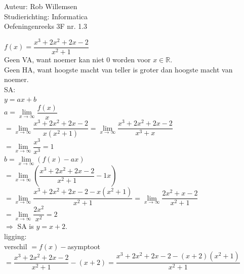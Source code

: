 \documentclass[a4paper]{article}
\newcommand{\limit}{\lim\limits}
\begin{document}
\noindent \large Auteur: Rob Willemsen \\
\noindent \large Studierichting: Informatica \\
\noindent \large Oefeningenreeks 3F nr. 1.3 \\

\medskip

\normalsize

$f(x) = \dfrac{x^3 + 2x^2 + 2x - 2}{x^2+1}$ \\

Geen VA, want noemer kan niet 0 worden voor $x \in \mathbb{R}$. \\

Geen HA, want hoogste macht van teller is groter dan hoogste macht van noemer. \\

SA: \\

$y = ax + b$ \\

$a = \limit_{x \rightarrow \infty} \dfrac{f(x)}{x}$ \\

$= \limit_{x \rightarrow \infty} \dfrac{x^3 + 2x^2 + 2x - 2}{x(x^2 + 1)} = \limit_{x \rightarrow \infty} \dfrac{x^3 + 2x^2 + 2x - 2}{x^3 + x}$ \\

$= \limit_{x \rightarrow \infty} \dfrac{x^3}{x^3} = 1$ \\

$b = \limit_{x \rightarrow \infty} (f(x) - ax)$ \\

$= \limit_{x \rightarrow \infty} \left( \dfrac{x^3 + 2x^2 + 2x - 2}{x^2+1} - 1x \right)$ \\

$= \limit_{x \rightarrow \infty} \dfrac{x^3 + 2x^2 + 2x - 2 - x(x^2 + 1)}{x^2+1} = \limit_{x \rightarrow \infty} \dfrac{2x^2 + x - 2}{x^2+1}$ \\

$= \limit_{x \rightarrow \infty}  \dfrac{2x^2}{x^2} = 2$ \\

$\Rightarrow$ SA is $y = x + 2$. \\


ligging: \\

verschil $= f(x)-$asymptoot\\

$= \dfrac{x^3 + 2x^2 + 2x - 2}{x^2+1} - (x + 2) = \dfrac{x^3 + 2x^2 + 2x - 2 - (x+2)(x^2+1)}{x^2+1}$ \\
\end{document}
